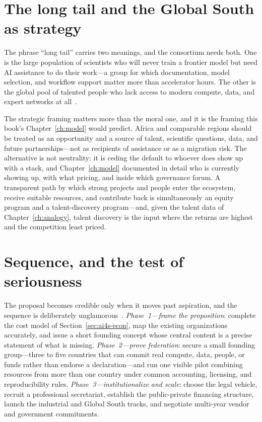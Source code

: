 \section{The long tail and the Global South as strategy}

The phrase ``long tail'' carries two meanings, and the consortium needs both. One is the large population of scientists who will never train a frontier model but need AI assistance to do their work---a group for which documentation, model selection, and workflow support matter more than accelerator hours. The other is the global pool of talented people who lack access to modern compute, data, and expert networks at all~\cite{consortium-record}.

The strategic framing matters more than the moral one, and it is the framing this book's Chapter~\ref{ch:model} would predict. Africa and comparable regions should be treated as an opportunity and a source of talent, scientific questions, data, and future partnerships---not as recipients of assistance or as a migration risk. The alternative is not neutrality: it is ceding the default to whoever does show up with a stack, and Chapter~\ref{ch:model} documented in detail who is currently showing up, with what pricing, and inside which governance forum. A transparent path by which strong projects and people enter the ecosystem, receive suitable resources, and contribute back is simultaneously an equity program and a talent-discovery program---and, given the talent data of Chapter~\ref{ch:analogy}, talent discovery is the input where the returns are highest and the competition least priced.

\section{Sequence, and the test of seriousness}

The proposal becomes credible only when it moves past aspiration, and the sequence is deliberately unglamorous~\cite{consortium-record}. \emph{Phase~1---frame the proposition}: complete the cost model of Section~\ref{sec:ai4s-econ}, map the existing organizations accurately, and issue a short founding concept whose central content is a precise statement of what is missing. \emph{Phase~2---prove federation}: secure a small founding group---three to five countries that can commit real compute, data, people, or funds rather than endorse a declaration---and run one visible pilot combining resources from more than one country under common accounting, licensing, and reproducibility rules. \emph{Phase~3---institutionalize and scale}: choose the legal vehicle, recruit a professional secretariat, establish the public-private financing structure, launch the industrial and Global South tracks, and negotiate multi-year vendor and government commitments.


